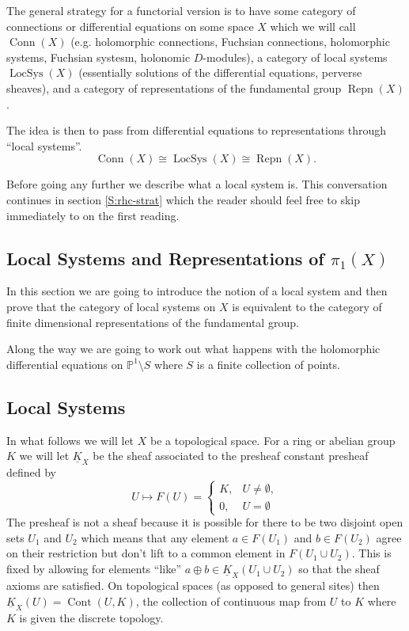 \documentclass[12pt]{book}
\numberwithin{equation}{section}
\theoremstyle{definition}
\theoremstyle{remark}
\newcommand{\PP}{\mathbb{P}}
\newcommand{\LocSys}{\operatorname{LocSys}}
\newcommand{\Conn}{\operatorname{Conn}}
\newcommand{\Repn}{\operatorname{Repn}}
\begin{document}
The general strategy for a functorial version is to have some category of connections or differential equations on some space $X$ which we will call $\Conn(X)$ (e.g. holomorphic connections, Fuchsian connections, holomorphic systems, Fuchsian systesm, holonomic $D$-modules), a category of local systems $\LocSys(X)$ (essentially solutions of the differential equations, perverse sheaves), and a category of representations of the fundamental group $\Repn(X)$. 

The idea is then to pass from differential equations to representations through ``local systems''.
\begin{equation}
\Conn(X) \cong \LocSys(X) \cong \Repn(X) .
\end{equation}

Before going any further we describe what a local system is. 
This conversation continues in section \ref{S:rhc-strat} which the reader should feel free to skip immediately to on the first reading. 


\subsection{Local Systems and Representations of $\pi_1(X)$}
In this section we are going to introduce the notion of a local system and then prove that the category of local systems on $X$ is equivalent to the category of finite dimensional representations of the fundamental group. 

Along the way we are going to work out what happens with the holomorphic differential equations on $\PP^1\setminus S$ where $S$ is a finite collection of points. 

\subsection{Local Systems}
In what follows we will let $X$ be a topological space. 
For a ring or abelian group $K$ we will let $\underline{K}_X$ be the sheaf associated to the presheaf  constant presheaf defined by 
$$ U\mapsto F(U) = \begin{cases}
K, & U\neq \emptyset ,\\
0, & U = \emptyset 
\end{cases}$$
The presheaf is not a sheaf because it is possible for there to be two disjoint open sets $U_1$ and $U_2$ which means that any element $a \in F(U_1)$ and $b\in F(U_2)$ agree on their restriction but don't lift to a common element in $F(U_1 \cup U_2)$.
This is fixed by allowing for elements ``like'' $a\oplus b \in \underline{K}_X(U_1 \cup U_2)$  so that the sheaf axioms are satisfied. 
On topological spaces (as opposed to general sites) then $\underline{K}_X(U) = \operatorname{Cont}(U, K)$, the collection of continuous map from $U$ to $K$ where $K$ is given the discrete topology.
\end{document}
